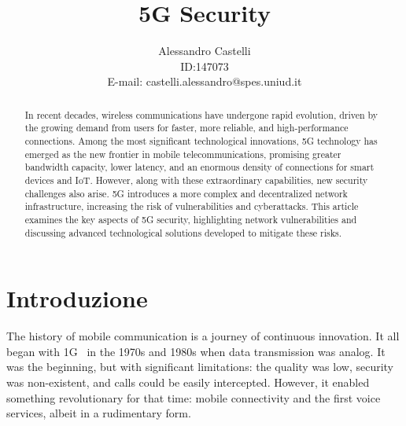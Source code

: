 \documentclass[english]{article}
\title{5G Security}
\author{Alessandro Castelli \\ ID:\@147073 \\ E-mail: castelli.alessandro@spes.uniud.it}
\begin{document}
\maketitle

\begin{abstract}
	In recent decades, wireless communications have undergone rapid evolution,
	driven by the growing demand from users for faster, more reliable, and
	high-performance connections. Among the most significant technological
	innovations, 5G technology has emerged as the new frontier in mobile
	telecommunications, promising greater bandwidth capacity, lower latency,
	and an enormous density of connections for smart devices and IoT. However,
	along with these extraordinary capabilities, new security challenges also
	arise. 5G introduces a more complex and decentralized network infrastructure,
	increasing the risk of vulnerabilities and cyberattacks. This article examines
	the key aspects of 5G security, highlighting network vulnerabilities and
	discussing advanced technological solutions developed to mitigate these risks.
\end{abstract}

\clearpage

\tableofcontents
\newpage
\section{Introduzione}
The history of mobile communication is a journey of continuous innovation. It
all began with 1G~\cite{dangi2021study} in the 1970s and 1980s when data
transmission was analog. It was the beginning, but with significant
limitations: the quality was low, security was non-existent, and calls could be
easily intercepted. However, it enabled something revolutionary for that time:
mobile connectivity and the first voice services, albeit in a rudimentary form.
\end{document}
